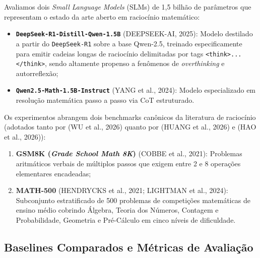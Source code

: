 \documentclass[9pt,conference]{IEEEtran}
\begin{document}
Avaliamos dois \textit{Small Language Models} (SLMs) de 1,5 bilh\~{a}o de par\^{a}metros que representam o estado da arte aberto em racioc\'{i}nio matem\'{a}tico:
\begin{itemize}
    \item \textbf{\texttt{DeepSeek-R1-Distill-Qwen-1.5B}} (DEEPSEEK-AI, 2025): Modelo destilado a partir do \texttt{DeepSeek-R1} sobre a base Qwen-2.5, treinado especificamente para emitir cadeias longas de racioc\'{i}nio delimitadas por tags \texttt{<think>...</think>}, sendo altamente propenso a fen\^{o}menos de \textit{overthinking} e autorreflex\~{a}o;
    \item \textbf{\texttt{Qwen2.5-Math-1.5B-Instruct}} (YANG et al., 2024): Modelo especializado em resolu\c{c}\~{a}o matem\'{a}tica passo a passo via CoT estruturado.
\end{itemize}

Os experimentos abrangem dois benchmarks can\^{o}nicos da literatura de racioc\'{i}nio (adotados tanto por (WU et al., 2026) quanto por (HUANG et al., 2026) e (HAO et al., 2026)):
\begin{enumerate}
    \item \textbf{GSM8K (\textit{Grade School Math 8K})} (COBBE et al., 2021): Problemas aritm\'{a}ticos verbais de m\'{u}ltiplos passos que exigem entre 2 e 8 opera\c{c}\~{o}es elementares encadeadas;
    \item \textbf{MATH-500} (HENDRYCKS et al., 2021; LIGHTMAN et al., 2024): Subconjunto estratificado de 500 problemas de competi\c{c}\~{o}es matem\'{a}ticas de ensino m\'{e}dio cobrindo \'{A}lgebra, Teoria dos N\'{u}meros, Contagem e Probabilidade, Geometria e Pr\'{e}-C\'{a}lculo em cinco n\'{i}veis de dificuldade.
\end{enumerate}

\subsection{Baselines Comparados e M\'{e}tricas de Avalia\c{c}\~{a}o}
\end{document}
